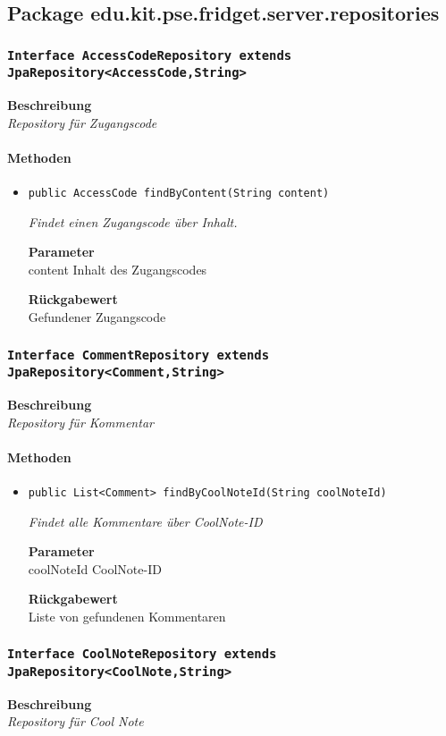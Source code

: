     \subsection{Package edu.kit.pse.fridget.server.repositories}
    \subsubsection{\texttt{Interface AccessCodeRepository extends JpaRepository<AccessCode,String>}}
    \textbf{Beschreibung} \\
    \textit{Repository für Zugangscode}
    \paragraph*{Methoden}
    \begin{itemize}
    	\item{\texttt{public AccessCode findByContent(String content)}}
    	
    	\textit{Findet einen Zugangscode über Inhalt.}
    	
    	\textbf{Parameter} \\
    	content Inhalt des Zugangscodes
    	
    	\textbf{Rückgabewert} \\
    	Gefundener Zugangscode
    \end{itemize}
    \subsubsection{\texttt{Interface CommentRepository extends JpaRepository<Comment,String>}}
    \textbf{Beschreibung} \\
    \textit{Repository für Kommentar}
    \paragraph*{Methoden}
    \begin{itemize}
    	\item{\texttt{public List<Comment> findByCoolNoteId(String coolNoteId)}}
    	
    	\textit{Findet alle Kommentare über CoolNote-ID}
    	
    	\textbf{Parameter} \\
    	coolNoteId CoolNote-ID
    	
    	\textbf{Rückgabewert} \\
    	Liste von gefundenen Kommentaren
    \end{itemize}
    \subsubsection{\texttt{Interface CoolNoteRepository extends JpaRepository<CoolNote,String>}}
    \textbf{Beschreibung} \\
    \textit{Repository für Cool Note}
